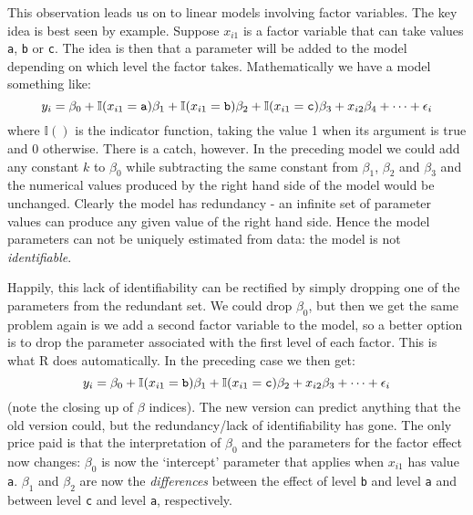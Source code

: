 \documentclass[10pt] {article}
\newcommand{\beq}{\begin{equation}}
\newcommand{\eeq}{\end{equation}}
\theoremstyle{definition}
\begin{document}
This observation leads us on to linear models involving factor variables. The key idea is best seen by example. Suppose $x_{i1} $ is a factor variable that can take values {\tt a}, {\tt b} or {\tt c}. The idea is then that a parameter will be added to the model depending on which level the factor takes. Mathematically we have a model something like:
$$
y_i = \beta_0 + \mathbb{I}(x_{i1}={\tt a}) \beta_1 + \mathbb{I}(x_{i1}={\tt b})\beta_2 + \mathbb{I}(x_{i1}={\tt c})\beta_3 + x_{i2} \beta_4 + \cdots + \epsilon_i 
$$
where $\mathbb{I}()$ is the indicator function, taking the value 1 when its argument is true and 0 otherwise. There is a catch, however. In the preceding model we could add any constant $k$ to $\beta_0$ while subtracting the same constant from $\beta_1$, $\beta_2$ and $\beta_3$ and the numerical values produced by the right hand side of the model would be unchanged. Clearly the model has redundancy - an infinite set of parameter values can produce any given value of the right hand side. Hence the model parameters can not be uniquely estimated from data: the model is not {\em identifiable}. 

Happily, this lack of identifiability can be rectified by simply dropping one of the parameters from the redundant set. We could drop $\beta_0$, but then we get the same problem again is we add a second factor variable to the model, so a better option is to drop the parameter associated with the first level of each factor. This is what R does automatically. In the preceding case we then get:
\beq
y_i = \beta_0  + \mathbb{I}(x_{i1}={\tt b})\beta_1 + \mathbb{I}(x_{i1}={\tt c})\beta_2 + x_{i2} \beta_3 + \cdots + \epsilon_i \label{factor.mod}
\eeq
(note the closing up of $\beta$ indices). The new version can predict anything that the old version could, but the redundancy/lack of identifiability has gone. The only price paid is that the interpretation of $\beta_0$ and the parameters for the factor effect now changes: $\beta_0$ is now the `intercept' parameter that applies when ${x}_{i1}$ has value {\tt a}.  $\beta_1$ and $\beta_2$ are now the {\em differences} between the effect of level {\tt b} and level {\tt a} and between level {\tt c} and level {\tt a}, respectively. 
\end{document}
